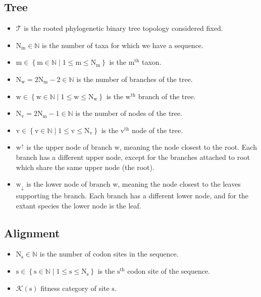 \documentclass{article}
\newcommand{\Tree}{\mathcal{T}}
\newcommand{\taxon}{\text{m}}
\newcommand{\Ntaxa}{\text{N}_{\taxon}}
\newcommand{\branch}{\text{w}}
\newcommand{\Nbranch}{\text{N}_{\branch}}
\newcommand{\up}{\branch^{\uparrow}}
\newcommand{\down}{\branch_{\downarrow}}
\newcommand{\node}{\text{v}}
\newcommand{\Nnode}{\text{N}_{\node}}
\newcommand{\site}{\text{s}}
\newcommand{\Nsite}{\text{N}_{\site}}
\newcommand{\catsite}{\mathcal{K}\left(\site\right)}
\begin{document}
\subsection{Tree}
\begin{itemize}
	\setlength\itemsep{-0.25em}
	\item $\Tree$ is the rooted phylogenetic binary tree topology considered fixed.
	\item $\Ntaxa \in \mathbb{N}$ is the number of taxa for which we have a sequence.
	\item $\taxon \in \left\{ \taxon \in \mathbb{N} \mid 1 \leq \taxon \leq \Ntaxa \right\}$ is the $\taxon^{\mathrm{th}}$ taxon.
	\item $\Nbranch = 2 \Ntaxa - 2 \in \mathbb{N}$ is the number of branches of the tree.
	\item $\branch \in \left\{ \branch \in \mathbb{N} \mid 1 \leq \branch \leq \Nbranch \right\}$ is the $\branch^{\mathrm{th}}$ branch of the tree.
	\item $\Nnode = 2 \Ntaxa - 1 \in \mathbb{N}$ is the number of nodes of the tree.
	\item $\node \in \left\{ \node \in \mathbb{N} \mid 1 \leq \node \leq \Nnode \right\}$ is the $\node^{\mathrm{th}}$ node of the tree.
	\item $\up$ is the upper node of branch $\branch$, meaning the node closest to the root. Each branch has a different upper node, except for the branches attached to root which share the same upper node (the root).
	\item $\down$ is the lower node of branch $\branch$, meaning the node closest to the leaves supporting the branch. Each branch has a different lower node, and for the extant species the lower node is the leaf.
\end{itemize}

\subsection{Alignment}
\begin{itemize}
	\setlength\itemsep{-0.25em}
	\item $\Nsite \in \mathbb{N}$ is the number of codon sites in the sequence.
	\item $\site \in \left\{ \site \in \mathbb{N} \mid 1 \leq \site \leq \Nsite \right\}$ is the $\site^{\mathrm{th}}$ codon site of the sequence.
	\item $\catsite$ fitness category of site $\site$.
\end{itemize}
\end{document}
